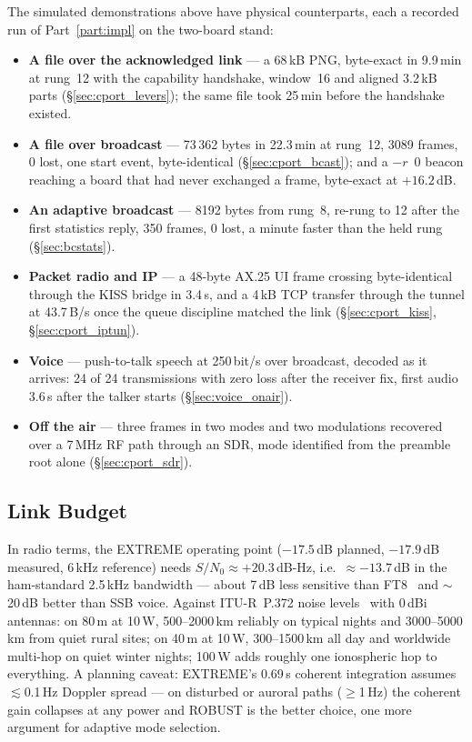 The simulated demonstrations above have physical counterparts, each a
recorded run of Part~\ref{part:impl} on the two-board stand:

\begin{itemize}
    \item \textbf{A file over the acknowledged link} --- a 68\,kB PNG,
          byte-exact in 9.9\,min at rung~12 with the capability
          handshake, window~16 and aligned 3.2\,kB parts
          (\S\ref{sec:cport_levers}); the same file took 25\,min
          before the handshake existed.
    \item \textbf{A file over broadcast} --- 73\,362 bytes in
          22.3\,min at rung~12, 3089 frames, 0 lost, one start event,
          byte-identical (\S\ref{sec:cport_bcast}); and a $-r$~0
          beacon reaching a board that had never exchanged a frame,
          byte-exact at $+16.2$\,dB.
    \item \textbf{An adaptive broadcast} --- 8192 bytes from rung~8,
          re-rung to 12 after the first statistics reply, 350 frames,
          0 lost, a minute faster than the held rung
          (\S\ref{sec:bcstats}).
    \item \textbf{Packet radio and IP} --- a 48-byte AX.25 UI frame
          crossing byte-identical through the KISS bridge in 3.4\,s,
          and a 4\,kB TCP transfer through the tunnel at 43.7\,B/s once
          the queue discipline matched the link
          (\S\ref{sec:cport_kiss}, \S\ref{sec:cport_iptun}).
    \item \textbf{Voice} --- push-to-talk speech at 250\,bit/s over
          broadcast, decoded as it arrives: 24 of 24 transmissions with
          zero loss after the receiver fix, first audio 3.6\,s after
          the talker starts (\S\ref{sec:voice_onair}).
    \item \textbf{Off the air} --- three frames in two modes and two
          modulations recovered over a 7\,MHz RF path through an SDR,
          mode identified from the preamble root alone
          (\S\ref{sec:cport_sdr}).
\end{itemize}

\subsection{Link Budget}

In radio terms, the EXTREME operating point ($-17.5$\,dB planned,
$-17.9$\,dB measured, 6\,kHz reference) needs
$S/N_0 \approx +20.3$\,dB-Hz, i.e.\ $\approx -13.7$\,dB in the
ham-standard 2.5\,kHz bandwidth --- about 7\,dB less sensitive than
FT8~\cite{ft8} and $\sim$20\,dB better than SSB voice.  Against
ITU-R~P.372 noise levels~\cite{itu_p372} with 0\,dBi antennas: on
80\,m at 10\,W, 500--2000\,km reliably on typical nights and
3000--5000\,km from quiet rural sites; on 40\,m at 10\,W,
300--1500\,km all day and worldwide multi-hop on quiet winter nights;
100\,W adds roughly one ionospheric hop to everything.  A planning
caveat: EXTREME's 0.69\,s coherent integration assumes
$\lesssim$0.1\,Hz Doppler spread --- on disturbed or auroral paths
($\ge$1\,Hz) the coherent gain collapses at any power and ROBUST is
the better choice, one more argument for adaptive mode selection.

